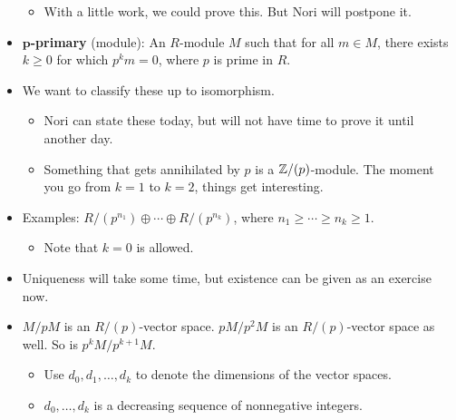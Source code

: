 \documentclass[../notes.tex]{subfiles}
\begin{document}
\begin{itemize}
    \begin{itemize}
        \item With a little work, we could prove this. But Nori will postpone it.
    \end{itemize}
    \item \textbf{$\bm{p}$-primary} (module): An $R$-module $M$ such that for all $m\in M$, there exists $k\geq 0$ for which $p^km=0$, where $p$ is prime in $R$.
    \item We want to classify these up to isomorphism.
    \begin{itemize}
        \item Nori can state these today, but will not have time to prove it until another day.
        \item Something that gets annihilated by $p$ is a $\mathbb{Z}/(p)$-module. The moment you go from $k=1$ to $k=2$, things get interesting.
    \end{itemize}
    \item Examples: $R/(p^{n_1})\oplus\cdots\oplus R/(p^{n_k})$, where $n_1\geq\cdots\geq n_k\geq 1$.
    \begin{itemize}
        \item Note that $k=0$ is allowed.
    \end{itemize}
    \item Uniqueness will take some time, but existence can be given as an exercise now.
    \item $M/pM$ is an $R/(p)$-vector space. $pM/p^2M$ is an $R/(p)$-vector space as well. So is $p^kM/p^{k+1}M$.
    \begin{itemize}
        \item Use $d_0,d_1,\dots,d_k$ to denote the dimensions of the vector spaces.
        \item $d_0,\dots,d_k$ is a decreasing sequence of nonnegative integers.
    \end{itemize}
\end{itemize}
\end{document}
